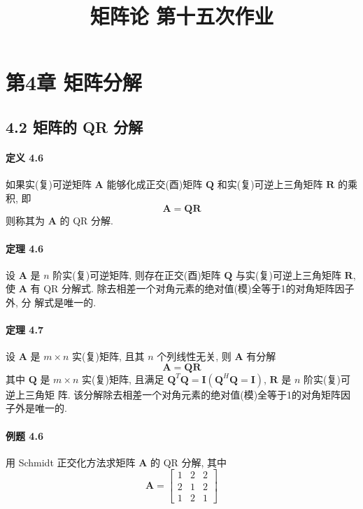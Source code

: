 \documentclass[12pt, a4paper, oneside, fontset=none]{ctexart}
\author{}
\date{}
\title{\vspace{-3em}\textbf{矩阵论 \quad 第十五次作业}\vspace{-3em}}
\begin{document}
\maketitle

\section*{第4章 \quad 矩阵分解}

\subsection*{4.2 \quad 矩阵的 QR 分解}

\paragraph*{定义 4.6} 如果实(复)可逆矩阵 $\bm{A}$ 能够化成正交(酉)矩阵 $\bm{Q}$ 和实(复)可逆上三角矩阵 $\bm{R}$
的乘积, 即
$$
    \bm{A} = \bm{QR}
$$
则称其为 $\bm{A}$ 的 QR 分解.

\paragraph*{定理 4.6} 设 $\bm{A}$ 是 $n$ 阶实(复)可逆矩阵, 则存在正交(酉)矩阵 $\bm{Q}$ 与实(复)可逆上三角矩阵
$\bm{R}$, 使 $\bm{A}$ 有 QR 分解式. 除去相差一个对角元素的绝对值(模)全等于1的对角矩阵因子外, 分
解式是唯一的.

\paragraph*{定理 4.7} 设 $\bm{A}$ 是 $m \times n$ 实(复)矩阵, 且其 $n$ 个列线性无关, 则 $\bm{A}$ 有分解
$$
    \bm{A} = \bm{QR}
$$
其中 $\bm{Q}$ 是 $m\times n$ 实(复)矩阵, 且满足 $\bm{Q}^T\bm{Q} = \bm{I}(\bm{Q}^H\bm{Q} = \bm{I})$, $\bm{R}$ 是 $n$ 阶实(复)可逆上三角矩
阵. 该分解除去相差一个对角元素的绝对值(模)全等于1的对角矩阵因子外是唯一的.

\paragraph*{例题 4.6} 用 Schmidt 正交化方法求矩阵 $\bm{A}$ 的 QR 分解, 其中
$$
    \bm{A} = \begin{bmatrix}
        1 & 2 & 2 \\
        2 & 1 & 2 \\
        1 & 2 & 1
    \end{bmatrix}
$$
\end{document}
